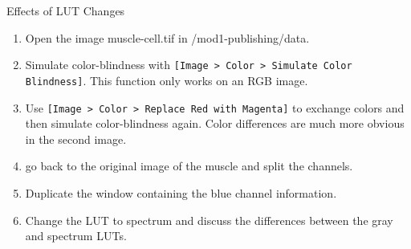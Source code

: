 \begin{taskbox}{Effects of LUT Changes}

\begin{enumerate}
	\item Open the image muscle-cell.tif in /mod1-publishing/data. 
	\item Simulate color-blindness with \texttt{[Image > Color > Simulate Color Blindness]}. This function only works on an RGB image. 
	\item Use \texttt{[Image > Color > Replace Red with Magenta]} to exchange colors and then simulate color-blindness again. Color differences are much more obvious in the second image.
	\item go back to the original image of the muscle and split the channels.
	\item Duplicate the window containing the blue channel information.
	\item Change the LUT to spectrum and discuss the differences between the gray and spectrum LUTs.
\end{enumerate}

\end{taskbox}

